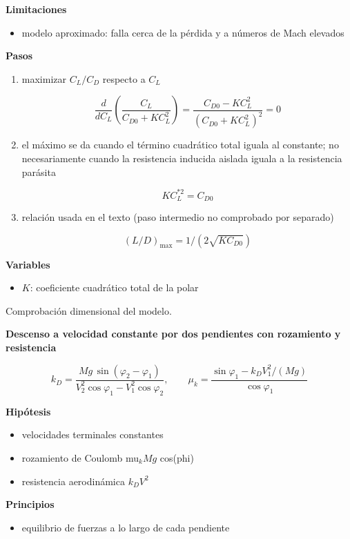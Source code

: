 \documentclass[10pt,openany]{book}
\begin{document}
\begin{tcolorbox}[title={Desarrollos del modelo}, studiumdef, breakable]
\noindent\textbf{Limitaciones}
\begin{itemize}
\item modelo aproximado: falla cerca de la pérdida y a números de Mach elevados
\end{itemize}

\noindent\textbf{Pasos}
\begin{enumerate}
\item
maximizar \(C_L/C_D\) respecto a \(C_L\)

\[
\frac{d}{dC_L}\left(\frac{C_L}{C_{D0} + K C_L^{2}}\right) = \frac{C_{D0} - K C_L^{2}}{\left(C_{D0} + K C_L^{2}\right)^{2}} = 0
\]
\item
el máximo se da cuando el término cuadrático total iguala al constante; no necesariamente cuando la resistencia inducida aislada iguala a la resistencia parásita

\[
K C_L^{*2} = C_{D0}
\]
\item
relación usada en el texto (paso intermedio no comprobado por separado)

\[
(L/D)_{\max} = 1/(2\sqrt{K C_{D0}})
\]
\end{enumerate}

\noindent\textbf{Variables}
\begin{itemize}
\item $K$: coeficiente cuadrático total de la polar
\end{itemize}

{\noindent\footnotesize Comprobación dimensional del modelo.\par}

\noindent\textbf{Descenso a velocidad constante por dos pendientes con rozamiento y resistencia}

\begin{equation}
k_D = \frac{Mg\,\sin(\varphi_2 - \varphi_1)}{V_2^{2}\cos\varphi_1 - V_1^{2}\cos\varphi_2},\qquad \mu_k = \frac{\sin\varphi_1 - k_D V_1^{2}/(Mg)}{\cos\varphi_1}
\label{eq:c07-dos-pendientes}
\end{equation}

\noindent\textbf{Hipótesis}
\begin{itemize}
\item velocidades terminales constantes
\item rozamiento de Coulomb mu\(_k M g\) cos(phi)
\item resistencia aerodinámica \(k_D V^2\)
\end{itemize}

\noindent\textbf{Principios}
\begin{itemize}
\item equilibrio de fuerzas a lo largo de cada pendiente
\end{itemize}


\end{tcolorbox}
\end{document}
